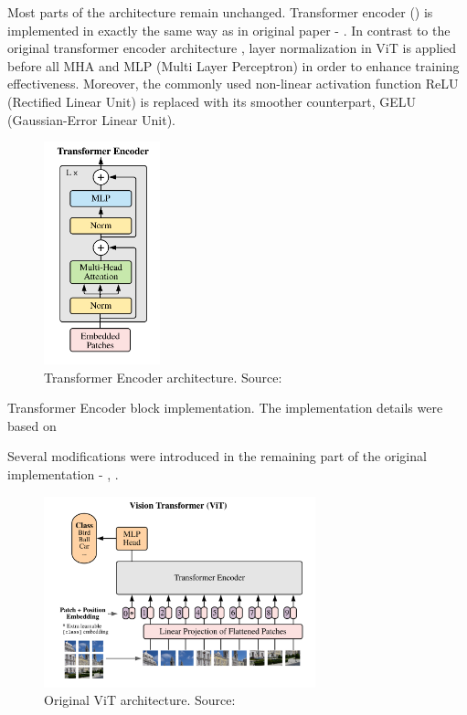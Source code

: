 Most parts of the architecture remain unchanged.
Transformer encoder () is implemented in exactly the same way as in original paper - .
In contrast to the original transformer encoder architecture \cite{Vaswani2017}, layer normalization in ViT is applied before all MHA and MLP (Multi Layer Perceptron) in order to enhance training effectiveness.
Moreover, the commonly used non-linear activation function ReLU (Rectified Linear Unit) is replaced with its smoother counterpart, GELU (Gaussian-Error Linear Unit).

\begin{figure}[H] 
  \centering     
  \includegraphics[width=0.3\textwidth]{img/transformer-encoder.png} 
  \caption{Transformer Encoder architecture. Source: \cite{vitPaper}}
  \label{fig:transformer-encoder}
\end{figure}

\newenvironment{longlistingA}{\captionsetup{type=listing, width=0.8\textwidth}}{}
\begin{longlistingA}
    \caption{Transformer Encoder block implementation. The implementation details were based on \cite{d2lViT}}
    \label{lst:transformer_encoder}
\end{longlistingA}
\vspace{12pt}

Several modifications were introduced in the remaining part of the original implementation - , .
\begin{figure}[H] 
  \centering     
  \includegraphics[width=0.7\textwidth]{img/original_vit.png} 
  \caption{Original ViT architecture. Source: \cite{vitPaper}}
  \label{fig:original-vit-architecture}
\end{figure}

